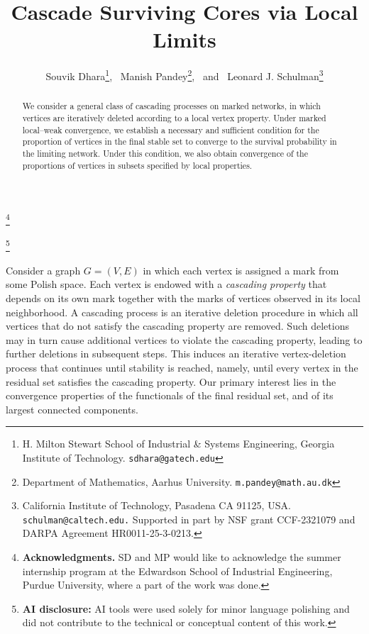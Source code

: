 \documentclass[11pt]{article}
\author{Souvik Dhara\thanks{H. Milton Stewart School of Industrial \& Systems Engineering, Georgia Institute of Technology. {\tt sdhara@gatech.edu}}, \ Manish Pandey\thanks{Department of Mathematics,  Aarhus University. {\tt m.pandey@math.au.dk}}, \ and \ Leonard J. Schulman\thanks{California Institute of Technology, Pasadena CA 91125, USA. 
                {\tt schulman@caltech.edu.} Supported in part by NSF grant CCF-2321079 and DARPA Agreement HR0011-25-3-0213.}}
\date{}
\title{Cascade Surviving Cores via Local Limits}
\theoremstyle{plain}
\newcommand\blfootnote[1]{%
  \begingroup
  \renewcommand\thefootnote{}\footnote{#1}%
  \addtocounter{footnote}{-1}%
  \endgroup
}
\begin{document}
\maketitle


\begin{abstract}
We consider a general class of cascading processes on marked networks, in which vertices are iteratively deleted according to a local vertex property. Under marked local--weak convergence, we establish a necessary and sufficient condition for the proportion of vertices in the final stable set to converge to the survival probability in the limiting network. Under this condition, we also obtain convergence of the proportions of vertices in subsets specified by local properties.

\end{abstract}
\blfootnote{\textbf{Acknowledgments.} 
SD and MP would like to acknowledge the summer internship program at the Edwardson School of Industrial Engineering, Purdue University, where a part of the work was done. 
}\blfootnote{\textbf{AI disclosure:} AI tools were used solely for minor language polishing and did not contribute to the technical or conceptual content of this work.}Consider a graph $G=(V,E)$ in which each vertex is assigned a mark from some Polish space. Each vertex is endowed with a \emph{cascading property} that depends on its own mark together with the marks of vertices observed in its local neighborhood. A cascading process is an iterative deletion procedure in which all vertices that do not satisfy the cascading property are removed. Such deletions may in turn cause additional vertices to violate the cascading property, leading to further deletions in subsequent steps. This induces an iterative vertex-deletion process that continues until stability is reached, namely, until every vertex in the residual set satisfies the cascading property. Our primary interest lies in the convergence properties of the functionals of the final residual set, and of its largest connected components.
\end{document}

